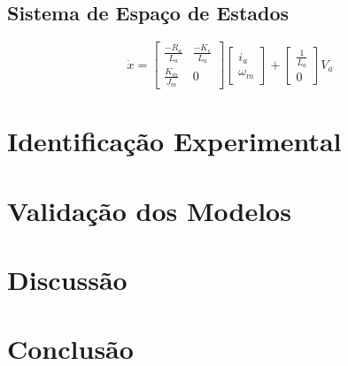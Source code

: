 \documentclass[12pt]{article}
\begin{document}
\subsection{Sistema de Espaço de Estados}
\begin{equation}
    \dot{x} = 
    \begin{bmatrix} 
        \frac{-R_a}{L_a} & \frac{-K_e}{L_a} \\
        \frac{K_m}{J_m} & 0
    \end{bmatrix}
    \begin{bmatrix}
        i_a\\
        \omega_m
    \end{bmatrix}
    +
    \begin{bmatrix}
        \frac{1}{L_a}\\
        0
    \end{bmatrix}V_a
\end{equation}


\section{Identificação Experimental}
\section{Validação dos Modelos}
\section{Discussão}
\section{Conclusão}
\end{document}
